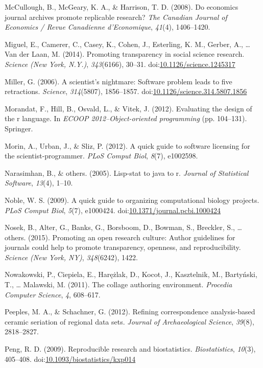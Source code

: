 \documentclass[american,man]{apa6}
\newcounter{author}
\begin{document}
{McCullough}, B., {McGeary}, K. A., \& Harrison, T. D. (2008). Do
economics journal archives promote replicable research? \emph{The
Canadian Journal of Economics / Revue Canadienne d'Economique},
\emph{41}(4), 1406--1420.

Miguel, E., Camerer, C., Casey, K., Cohen, J., Esterling, K. M., Gerber,
A., \ldots{} Van der Laan, M. (2014). Promoting transparency in social
science research. \emph{Science (New York, N.Y.)}, \emph{343}(6166),
30--31.
doi:\href{http://dx.doi.org/10.1126/science.1245317}{10.1126/science.1245317}

Miller, G. (2006). A scientist's nightmare: Software problem leads to
five retractions. \emph{Science}, \emph{314}(5807), 1856--1857.
doi:\href{http://dx.doi.org/10.1126/science.314.5807.1856}{10.1126/science.314.5807.1856}

Morandat, F., Hill, B., Osvald, L., \& Vitek, J. (2012). Evaluating the
design of the r language. In \emph{ECOOP 2012--Object-oriented
programming} (pp. 104--131). Springer.

Morin, A., Urban, J., \& Sliz, P. (2012). A quick guide to software
licensing for the scientist-programmer. \emph{PLoS Comput Biol},
\emph{8}(7), e1002598.

Narasimhan, B., \& others. (2005). Lisp-stat to java to r. \emph{Journal
of Statistical Software}, \emph{13}(4), 1--10.

Noble, W. S. (2009). A quick guide to organizing computational biology
projects. \emph{PLoS Comput Biol}, \emph{5}(7), e1000424.
doi:\href{http://dx.doi.org/10.1371/journal.pcbi.1000424}{10.1371/journal.pcbi.1000424}

Nosek, B., Alter, G., Banks, G., Borsboom, D., Bowman, S., Breckler, S.,
\ldots{} others. (2015). Promoting an open research culture: Author
guidelines for journals could help to promote transparency, openness,
and reproducibility. \emph{Science (New York, NY)}, \emph{348}(6242),
1422.

Nowakowski, P., Ciepiela, E., Har{\k{e}}{ż}lak, D., Kocot, J.,
Kasztelnik, M., Barty{ń}ski, T., \ldots{} Malawski, M. (2011). The
collage authoring environment. \emph{Procedia Computer Science},
\emph{4}, 608--617.

Peeples, M. A., \& Schachner, G. (2012). Refining correspondence
analysis-based ceramic seriation of regional data sets. \emph{Journal of
Archaeological Science}, \emph{39}(8), 2818--2827.

Peng, R. D. (2009). Reproducible research and biostatistics.
\emph{Biostatistics}, \emph{10}(3), 405--408.
doi:\href{http://dx.doi.org/10.1093/biostatistics/kxp014}{10.1093/biostatistics/kxp014}
\end{document}
